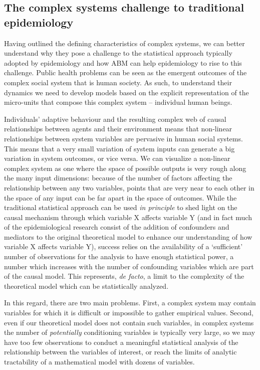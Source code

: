 \documentclass[review]{elsarticle}
\begin{document}
\subsection{The complex systems challenge to traditional epidemiology}
Having outlined the defining characteristics of complex systems, we can better understand why they pose a challenge to the statistical approach typically adopted by epidemiology and how ABM can help epidemiology to rise to this challenge. Public health problems can be seen as the emergent outcomes of the complex social system that is human society. As such, to understand their dynamics we need to develop models based on the explicit representation of the micro-units that compose this complex system -- individual human beings. 

Individuals' adaptive behaviour and the resulting complex web of causal relationships between agents and their environment means that non-linear relationships between system variables are pervasive in human social systems.  This means that a very small variation of system inputs can generate a big variation in system outcomes, or vice versa. We can visualize a non-linear complex system as one where the space of possible outputs is very rough along the many input dimensions: because of the number of factors affecting the relationship between any two variables, points that are very near to each other in the space of any input can be far apart in the space of outcomes. While the traditional statistical approach can be used \textit{in principle} to shed light on the causal mechanism through which variable X affects variable Y (and in fact much of the epidemiological research consist of the addition of confounders and mediators to the original theoretical model to enhance our understanding of how variable X affects variable Y), success relies on the availability of a `sufficient' number of observations for the analysis to have enough statistical power, a number which increases with the number of confounding variables which are part of the causal model.
This represents, \textit{de facto}, a limit to the complexity of the theoretical model which can be statistically analyzed. 

In this regard, there are two main problems. First, a complex system may contain variables for which it is difficult or impossible to gather empirical values.  Second, even if our theoretical model does not contain such variables, in complex systems the number of \textit{potentially} conditioning variables is typically very large, so we may have too few observations to conduct a meaningful statistical analysis of the relationship between the variables of interest, or reach the limits of analytic tractability of a mathematical model with dozens of variables.
\end{document}
